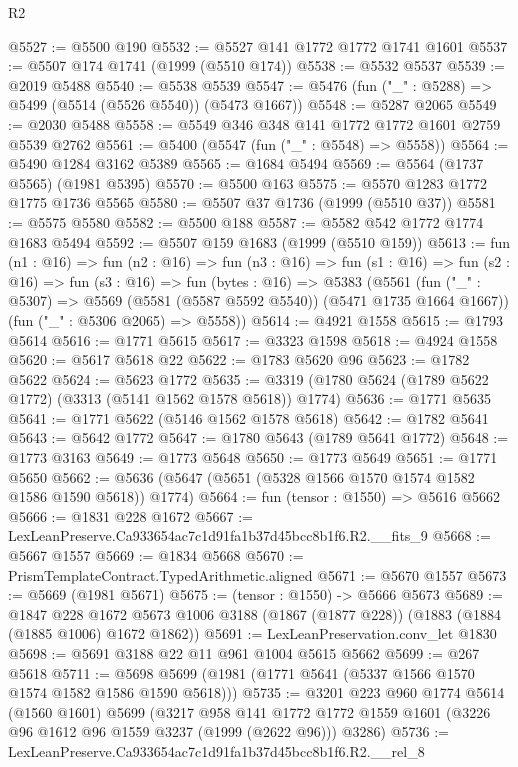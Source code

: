 \begin{lexlean}{R2}
\begin{coremodule}
@5527 := @5500 @190
@5532 := @5527 @141 @1772 @1772 @1741 @1601
@5537 := @5507 @174 @1741 (@1999 (@5510 @174))
@5538 := @5532 @5537
@5539 := @2019 @5488
@5540 := @5538 @5539
@5547 := @5476 (fun ("_" : @5288) => @5499 (@5514 (@5526 @5540)) (@5473 @1667))
@5548 := @5287 @2065
@5549 := @2030 @5488
@5558 := @5549 @346 @348 @141 @1772 @1772 @1601 @2759 @5539 @2762
@5561 := @5400 (@5547 (fun ("_" : @5548) => @5558))
@5564 := @5490 @1284 @3162 @5389
@5565 := @1684 @5494
@5569 := @5564 (@1737 @5565) (@1981 @5395)
@5570 := @5500 @163
@5575 := @5570 @1283 @1772 @1775 @1736 @5565
@5580 := @5507 @37 @1736 (@1999 (@5510 @37))
@5581 := @5575 @5580
@5582 := @5500 @188
@5587 := @5582 @542 @1772 @1774 @1683 @5494
@5592 := @5507 @159 @1683 (@1999 (@5510 @159))
@5613 := fun (n1 : @16) =>
  fun (n2 : @16) =>
  fun (n3 : @16) =>
  fun (s1 : @16) =>
  fun (s2 : @16) =>
  fun (s3 : @16) =>
  fun (bytes : @16) =>
  @5383
    (@5561
      (fun ("_" : @5307) => @5569 (@5581 (@5587 @5592 @5540)) (@5471 @1735 @1664 @1667))
      (fun ("_" : @5306 @2065) => @5558))
@5614 := @4921 @1558
@5615 := @1793 @5614
@5616 := @1771 @5615
@5617 := @3323 @1598
@5618 := @4924 @1558
@5620 := @5617 @5618 @22
@5622 := @1783 @5620 @96
@5623 := @1782 @5622
@5624 := @5623 @1772
@5635 := @3319 (@1780 @5624 (@1789 @5622 @1772) (@3313 (@5141 @1562 @1578 @5618)) @1774)
@5636 := @1771 @5635
@5641 := @1771 @5622 (@5146 @1562 @1578 @5618)
@5642 := @1782 @5641
@5643 := @5642 @1772
@5647 := @1780 @5643 (@1789 @5641 @1772)
@5648 := @1773 @3163
@5649 := @1773 @5648
@5650 := @1773 @5649
@5651 := @1771 @5650
@5662 := @5636 (@5647 (@5651 (@5328 @1566 @1570 @1574 @1582 @1586 @1590 @5618)) @1774)
@5664 := fun (tensor : @1550) => @5616 @5662
@5666 := @1831 @228 @1672
@5667 := LexLeanPreserve.Ca933654ac7c1d91fa1b37d45bcc8b1f6.R2.__fits_9
@5668 := @5667 @1557
@5669 := @1834 @5668
@5670 := PrismTemplateContract.TypedArithmetic.aligned
@5671 := @5670 @1557
@5673 := @5669 (@1981 @5671)
@5675 := (tensor : @1550) -> @5666 @5673
@5689 := @1847
    @228
    @1672
    @5673
    @1006
    @3188
    (@1867 (@1877 @228))
    (@1883 (@1884 (@1885 @1006) @1672 @1862))
@5691 := LexLeanPreservation.conv_let @1830
@5698 := @5691 @3188 @22 @11 @961 @1004 @5615 @5662
@5699 := @267 @5618
@5711 := @5698 @5699 (@1981 (@1771 @5641 (@5337 @1566 @1570 @1574 @1582 @1586 @1590 @5618)))
@5735 := @3201
    @223
    @960
    @1774
    @5614
    (@1560 @1601)
    @5699
    (@3217
      @958
      @141
      @1772
      @1772
      @1559
      @1601
      (@3226 @96 @1612 @96 @1559 @3237 (@1999 (@2622 @96)))
      @3286)
@5736 := LexLeanPreserve.Ca933654ac7c1d91fa1b37d45bcc8b1f6.R2.__rel_8

\end{coremodule}
\end{lexlean}
